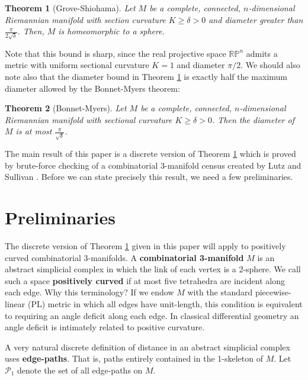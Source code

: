 \documentclass[12pt]{article}
\theoremstyle{plain}
\newtheorem{theorem}{Theorem}
\theoremstyle{definition}
\theoremstyle{remark}
\begin{document}
\begin{theorem}[Grove-Shiohama] Let $M$ be a complete, connected, $n$-dimensional Riemannian manifold with section curvature $K \geq \delta > 0$ and diameter greater than $\frac{\pi}{2\sqrt{\delta}}$. Then, $M$ is homeomorphic to a sphere.
\label{thm:grove_shiohama}
\end{theorem}

\noindent Note that this bound is sharp, since the real projective space $\mathbb{RP}^n$ admits a metric with uniform sectional curvature $K=1$ and diameter $\pi/2$. We should also note also that the diameter bound in Theorem \ref{thm:grove_shiohama} is exactly half the maximum diameter allowed by the Bonnet-Myers theorem:

\begin{theorem}[Bonnet-Myers] Let $M$ be a complete, connected, $n$-dimensional Riemannian manifold with sectional curvature $K \geq \delta > 0$. Then the diameter of $M$ is at most $\frac{\pi}{\sqrt{\delta}}$.
\label{thm:bonnet_myers}
\end{theorem}

\noindent The main result of this paper is a discrete version of Theorem \ref{thm:grove_shiohama} which is proved by brute-force checking of a combinatorial 3-manifold census created by Lutz and Sullivan \cite{LS}. Before we can state precisely this result, we need a few preliminaries.

\section{Preliminaries}
\label{sect:basics}

The discrete version of Theorem \ref{thm:grove_shiohama} given in this paper will apply to positively curved combinatorial 3-manifolds. A \textbf{combinatorial 3-manifold} $M$ is an abstract simplicial complex in which the link of each vertex is a 2-sphere. We call such a space \textbf{positively curved} if at most five tetrahedra are incident along each edge. Why this terminology? If we endow $M$ with the standard piecewise-linear (PL) metric in which all edges have unit-length, this condition is equivalent to requiring an angle deficit along each edge. In classical differential geometry an angle deficit is intimately related to positive curvature.

A very natural discrete definition of distance in an abstract simplicial complex uses \textbf{edge-paths}. That is, paths entirely contained in the 1-skeleton of $M$. Let $\mathcal{P}_1$ denote the set of all edge-paths on $M$.
\end{document}
